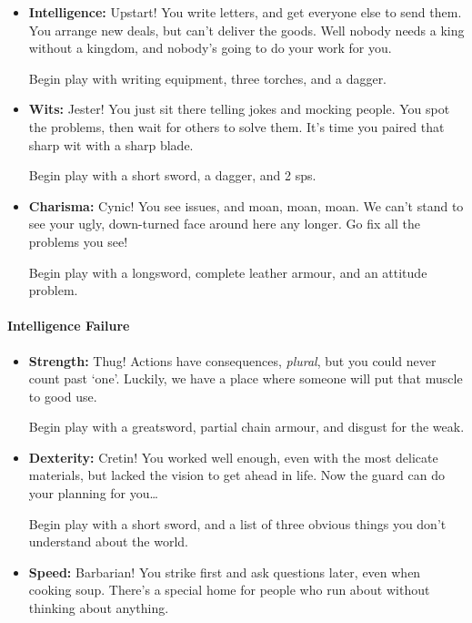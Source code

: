 \begin{multicols}{2}
\begin{itemize}
  Begin play with a javelin, partial leather armour, 80 \glspl{cp}, and nasty black eye.
  \item
  \textbf{Intelligence:}
  Upstart!
  You write letters, and get everyone else to send them.
  You arrange new deals, but can't deliver the goods.
  Well nobody needs a king without a kingdom, and nobody's going to do your work for you.

  Begin play with writing equipment, three torches, and a dagger.
  \item
  \textbf{Wits:}
  Jester!
  You just sit there telling jokes and mocking people.
  You spot the problems, then wait for others to solve them.
  It's time you paired that sharp wit with a sharp blade.

  Begin play with a short sword, a dagger, and 2 \glspl{sp}.
  \item
  \textbf{Charisma:}
  Cynic!
  You see issues, and moan, moan, moan.
  We can't stand to see your ugly, down-turned face around here any longer.
  Go fix all the problems you see!

  Begin play with a longsword, complete leather armour, and an attitude problem.

\end{itemize}

\paragraph{Intelligence Failure}

\begin{itemize}

  \item
  \textbf{Strength:}
  Thug!
  Actions have consequences, \emph{plural}, but you could never count past `one'.
  Luckily, we have a place where someone will put that muscle to good use.

  Begin play with a greatsword, partial chain armour, and disgust for the weak.
  \item
  \textbf{Dexterity:}
  Cretin!
  You worked well enough, even with the most delicate materials, but lacked the vision to get ahead in life.
  Now the \gls{guard} can do your planning for you\ldots

  Begin play with a short sword, and a list of three obvious things you don't understand about the world.

  \item
  \textbf{Speed:}
  Barbarian!
  You strike first and ask questions later, even when cooking soup.
  There's a special home for people who run about without thinking about anything.


\end{itemize}
\end{multicols}
